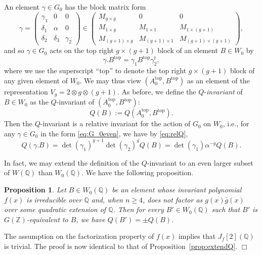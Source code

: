 \documentclass[11pt]{article}
\def\Z{{\mathbb Z}}
\def\Q{{\mathbb Q}}
\def\Z{{\mathbb Z}}
\def\Q{{\mathbb Q}}
\def\sub{{\textrm{top}}}
\newtheorem{proposition}[theorem]{Proposition}
\newenvironment{proof}{\noindent {\bf Proof:}}{$\Box$ \vspace{2 ex}}
\begin{document}
An element $\gamma\in G_0$ has the block matrix form
\begin{equation}\label{eq:G_0even}
\gamma=\left(\begin{array}{ccc}\gamma_1 & 0 & 0\\ \delta_1 & \alpha & 0\\ \delta_2 & \delta_3 & \gamma_2
\end{array}\right)\in\left(\begin{array}{ccc}M_{g\times g} & 0 & 0\\ M_{1\times g} & M_{1\times 1} & M_{1\times (g+1)}\\ M_{(g+1)\times g} & M_{(g+1)\times 1} & M_{(g+1)\times (g+1)}
\end{array}\right),
\end{equation}
and so $\gamma\in G_0$ acts on the top right $g\times (g+1)$ block
of an element $B\in W_0$ by
$$\gamma.B^\sub = \gamma_1B^\sub\gamma_2^t,$$ where we use the
superscript ``top'' to denote the top right $g\times (g+1)$ block of
any given element of $W_0$. We may thus view $(A_0^\sub,B^\sub)$ as an
element of the representation $V_g=2\otimes g\otimes (g+1)$. As
before, we define the $Q$-{\it invariant} of $B\in W_0$ as the
$Q$-invariant of $(A_0^\sub,B^\sub)$:
\begin{equation}\label{eqQBeven}
Q(B):=Q(A_0^\sub,B^\sub).
\end{equation}
Then the $Q$-invariant is a relative invariant for the action of $G_0$ on $W_0$, i.e.,
for any $\gamma\in G_0$ in the form \eqref{eq:G_0even}, we have by \eqref{eq:relQ},
\begin{equation}\label{eq:weightG_0even}
Q(\gamma.B) = \det(\gamma_1)^{g+1}\det(\gamma_2)^gQ(B) =
\det(\gamma_1)\alpha^{-g}Q(B).
\end{equation}

In fact, we may extend the definition of the
$Q$-invariant to an even larger subset of $W(\Q)$ than $W_0(\Q)$.
We have the following proposition.

\begin{proposition}\label{prop:extendQeven}
Let $B\in W_0(\Q)$ be an element whose invariant polynomial $f(x)$ is
irreducible over $\Q$ and, when $n\geq 4$, does not factor as $g(x)\bar{g}(x)$ over some quadratic extension of $\Q$. Then for every $B'\in W_0(\Q)$ such that $B'$ is $G(\Z)$-equivalent to $B$, we have
$Q(B')=\pm Q(B)$.
\end{proposition}
\begin{proof}
The assumption on the factorization property of $f(x)$ implies that $J_f[2](\Q)$ is trivial.
The proof is now identical to that of Proposition~\ref{prop:extendQ}.
\end{proof}
\end{document}
